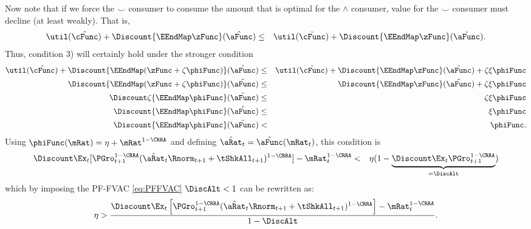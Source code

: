 \documentclass[titlepage]{\econtex}\providecommand{\texname}{BufferStockTheory}%
\begin{document}
Now note that if we force the $\smile$ consumer to consume the amount that is
optimal for the $\wedge$ consumer, value for the $\smile$ consumer must decline (at least weakly).  That is,
\begin{eqnarray*}
\util(\hat{\cFunc})+\Discount \{\EEndMap \zFunc \}(\hat{\aFunc})  & \leq &\util(\breve{\cFunc})+\Discount \{\EEndMap \zFunc \}(\breve{\aFunc})
.
\end{eqnarray*}
Thus, condition 3) will certainly hold under the stronger condition
\begin{eqnarray*}
\util(\hat{\cFunc})+\Discount\{\EEndMap (\zFunc+\zeta \phiFunc) \}(\hat{\aFunc})  & \leq & \util(\hat{\cFunc})+\Discount\{\EEndMap \zFunc \}(\hat{\aFunc})  + \zeta \xi \phiFunc
\\ \Discount\{\EEndMap (\zFunc+\zeta \phiFunc) \}(\hat{\aFunc})  & \leq & \Discount\{\EEndMap \zFunc  \}(\hat{\aFunc})  + \zeta \xi \phiFunc
\\ \Discount\zeta \{\EEndMap \phiFunc \}(\hat{\aFunc})  & \leq & \zeta \xi \phiFunc
\\ \Discount\{\EEndMap \phiFunc \}(\hat{\aFunc})  & \leq & \xi \phiFunc
\\ \Discount\{\EEndMap \phiFunc \}(\hat{\aFunc})  & < & \phiFunc \label{eq:reqCondWeak}
.
\end{eqnarray*}
Using
$\phiFunc(\mRat)= \eta + \mRat^{1-\CRRA}$
and defining $\hat{\aRat}_{t}=\hat{\aFunc}(\mRat_{t})$, this condition is
\begin{eqnarray*}
\Discount \Ex_{t}[{\PGro}_{t+1}^{1-\CRRA}(\hat{\aRat}_{t}\Rnorm_{t+1}+\tShkAll_{t+1})^{1-\CRRA}]-\mRat_{t}^{1-\CRRA} & < & \eta(1-\underbrace{\Discount\Ex_{t}{\PGro}_{t+1}^{1-\CRRA}}_{=\DiscAlt})
\end{eqnarray*}
which by imposing the
 PF-FVAC \eqref{eq:PFFVAC} 
  $\DiscAlt<1$ can be rewritten as:
\begin{eqnarray}
 \eta>\frac{\Discount \Ex_{t}\left[{\PGro}_{t+1}^{1-\CRRA}(\hat{\aRat}_{t}\Rnorm_{t+1}+\tShkAll_{t+1})^{1-\CRRA}\right]-\mRat_{t}^{1-\CRRA}}{1-\DiscAlt}\label{eq:KeyCondition}.
\end{eqnarray}
\end{document}
